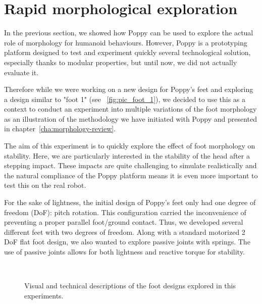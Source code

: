
\newpage
\section{Rapid morphological exploration} %
\label{sec:morphology-variable}

In the previous section, we showed how Poppy can be used to explore the actual role of morphology for humanoid behaviours. However, Poppy is a prototyping platform designed to test and experiment quickly several technological solution, especially thanks to modular properties, but until now, we did not actually evaluate it.

Therefore while we were working on a new design for Poppy's feet and exploring a design similar to "foot 1" (see \figurename~\ref{fig:pic_foot_1}), we decided to use this as a context to conduct an experiment into multiple variations of the foot morphology as an illustration of the methodology we have initiated with Poppy and presented in chapter~\ref{cha:morphology-review}.


The aim of this experiment is to quickly explore the effect of foot morphology on stability. Here, we are particularly interested in the stability of the head after a stepping impact. These impacts are quite challenging to simulate realistically and the natural compliance of the Poppy platform means it is even more important to test this on the real robot.

For the sake of lightness, the initial design of Poppy's feet only had one degree of freedom (DoF): pitch rotation. This configuration carried the inconvenience of preventing a proper parallel foot/ground contact. Thus, we developed several different feet with two degrees of freedom. Along with a standard motorized 2 DoF flat foot design, we also wanted to explore passive joints with springs. The use of passive joints allows for both lightness and reactive torque for stability.


\begin{figure}[p]
\centering
    \hfil
    \\
    \hfil


    \caption{Visual and technical descriptions of the foot designs explored in this experiments.}
    \label{fig:foot_variants}
\end{figure}


